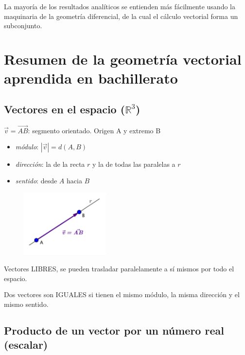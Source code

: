 \textcolor{gris}{ La mayoría de los resultados analíticos se entienden más fácilmente usando la maquinaria de la geometría diferencial, de la cual el cálculo vectorial forma un subconjunto.}

\rightline{\textcolor{gris}{Fuente: Wikipedia}}



\section{Resumen de la geometría vectorial aprendida en bachillerato}


\subsection{Vectores en el espacio ($\mathbb R^3$)}


$\vec v= \overrightarrow { AB }  $: segmento orientado. Origen A y extremo B
	\begin{multicols}{2}		
	\begin{itemize}
	\item \textit{módulo}: $|\vec v|=d(A,B)$
	\item \textit{dirección}: la de la recta $r$ y la de todas las paralelas a $r$
	\item \textit{sentido}: desde $A$ hacia $B$
	\end{itemize}
	\begin{figure}[H]
		\centering
		\includegraphics[width=0.4\textwidth]{imagenes/imagenescv/T10IM01.png}
	\end{figure}
	\end{multicols}

Vectores LIBRES, se pueden trasladar paralelamente a sí mismos por todo el espacio.
				
Dos vectores son IGUALES si tienen el mismo módulo, la misma dirección y el mismo sentido.

\subsection{Producto de un vector por un número real (escalar)}

